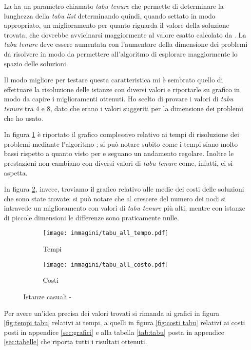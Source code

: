 La \tabu ha un parametro chiamato \emph{tabu tenure} che permette di determinare la lunghezza della \emph{tabu list} determinando quindi, quando settato in modo appropriato, un miglioramento per quanto riguarda il valore della soluzione trovata, che dovrebbe avvicinarsi maggiormente al valore esatto calcolato da .
La \emph{tabu tenure} deve essere aumentata con l'aumentare della dimensione dei problemi da risolvere in modo da permettere all'algoritmo di esplorare maggiormente lo spazio delle soluzioni.

Il modo migliore per testare questa caratteristica mi è sembrato quello di effettuare la risoluzione delle istanze con diversi valori e riportarle su grafico in modo da capire i miglioramenti ottenuti.
Ho scelto di provare i valori di \emph{tabu tenure} tra $4$ e $8$, dato che erano i valori suggeriti per la dimensione dei problemi che ho usato.

In figura \ref{fig:all tempi tabu} è riportato il grafico complessivo relativo ai tempi di risoluzione dei problemi mediante l'algoritmo \tabu; si può notare subito come i tempi siano molto bassi rispetto a quanto visto per  e seguano un andamento regolare.
Inoltre le prestazioni non cambiano con diversi valori di \emph{tabu tenure} come, infatti, ci si aspetta.

In figura \ref{fig:all costi tabu}, invece, troviamo il grafico relativo alle medie dei costi delle soluzioni che sono state trovate: si può notare che al crescere del numero dei nodi si intravede un miglioramento con valori di \emph{tabu tenure} più alti, mentre con istanze di piccole dimensioni le differenze sono praticamente nulle.

\begin{figure}[htb]
	\centering
	\begin{subfigure}[b]{.45\textwidth}
			\texttt{[image: immagini/tabu\_all\_tempo.pdf]}
			\caption{Tempi}
			\label{fig:all tempi tabu}
	\end{subfigure}
	\quad
	\begin{subfigure}[b]{.45\textwidth}
			\texttt{[image: immagini/tabu\_all\_costo.pdf]}
			\caption{Costi}
			\label{fig:all costi tabu}
	\end{subfigure}
	\caption{Istanze casuali - \tabu}
	\label{fig:all tempi costi tabu}
\end{figure}

Per avere un'idea precisa dei valori trovati si rimanda ai grafici in figura \ref{fig:tempi tabu} relativi ai tempi, a quelli in figura \ref{fig:costi tabu} relativi ai costi posti in appendice \ref{sec:grafici} e alla tabella \ref{tab:tabu} posta in appendice \ref{sec:tabelle} che riporta tutti i risultati ottenuti.